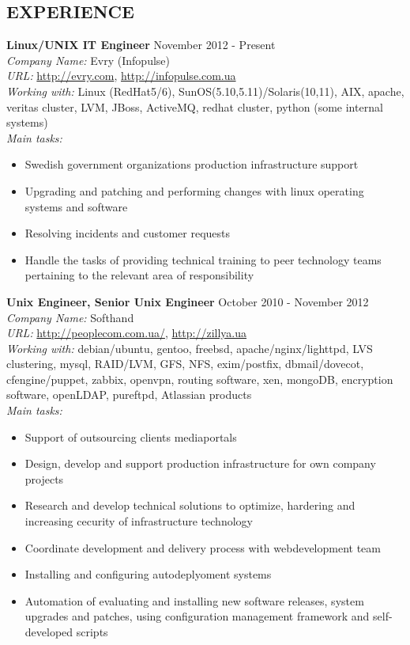 \documentclass[mymargin,10pt]{res} %
\begin{document}
\begin{resume}
 
\section{EXPERIENCE}

{\bf Linux/UNIX IT Engineer} \hfill November 2012 - Present \\
{\sl Company Name:} Evry (Infopulse) \\
{\sl URL:} \url{http://evry.com}, \url{http://infopulse.com.ua} \\
{\sl Working with:} Linux (RedHat5/6), SunOS(5.10,5.11)/Solaris(10,11), AIX, apache, veritas cluster, LVM,
JBoss, ActiveMQ, redhat cluster, python (some internal systems) \\
{\sl Main tasks:}
\begin{itemize}
\item Swedish government organizations production infrastructure support
\item Upgrading and patching and performing changes with linux operating systems and software
\item Resolving incidents and customer requests
\item Handle the tasks of providing technical training to peer technology teams pertaining to the
  relevant area of responsibility
\end{itemize}


{\bf Unix Engineer, Senior Unix Engineer} \hfill October 2010 - November 2012 \\
{\sl Company Name:} Softhand \\
{\sl URL:} \url{http://peoplecom.com.ua/}, \url{http://zillya.ua}\\
{\sl Working with:} debian/ubuntu, gentoo, freebsd, apache/nginx/lighttpd, LVS clustering, mysql,
RAID/LVM, GFS, NFS, exim/postfix, dbmail/dovecot, cfengine/puppet, zabbix, openvpn, routing software,
xen, mongoDB, encryption software, openLDAP, pureftpd, Atlassian products \\
{\sl Main tasks:}
\begin{itemize}
\item Support of outsourcing clients mediaportals
\item Design, develop and support production infrastructure for own company projects
\item Research and develop technical solutions to optimize, hardering and increasing cecurity of infrastructure technology
\item Coordinate development and delivery process with webdevelopment team
\item Installing and configuring autodeplyoment systems
\item Automation of evaluating and installing new software releases, system upgrades and patches,
  using configuration management framework and self-developed scripts
\end{itemize}


\end{resume}
\end{document}
